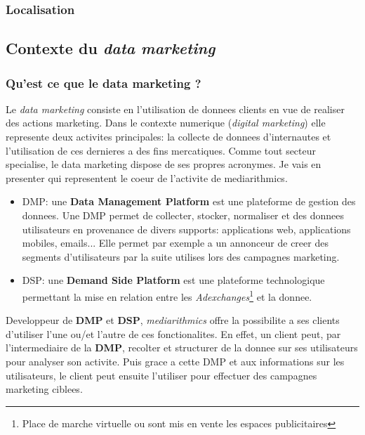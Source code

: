         \subsubsection{Localisation}
    \subsection{Contexte du \emph{data marketing}}
        \subsubsection{Qu'est ce que le data marketing ?}
        Le \emph{data marketing} consiste en l'utilisation de donnees clients en vue de realiser des actions marketing. 
        Dans le contexte numerique (\emph{digital marketing}) elle represente deux activites principales: la collecte de
        donnees d'internautes et l'utilisation de ces dernieres a des fins mercatiques. Comme tout secteur specialise, 
        le data marketing dispose de ses propres acronymes. Je vais en presenter qui representent le coeur de l'activite
        de mediarithmics.
        \begin{itemize}
            \item DMP: une \textbf{Data Management Platform} est une plateforme de gestion des donnees. Une DMP permet
            de collecter, stocker, normaliser et des donnees utilisateurs en provenance de divers supports: applications
            web, applications mobiles, emails... Elle permet par exemple a un annonceur de creer des segments 
            d'utilisateurs par la suite utilises lors des campagnes marketing.
            \item DSP: une \textbf{Demand Side Platform} est une plateforme technologique permettant la mise en relation
            entre les \emph{Adexchanges}\footnote{Place de marche virtuelle ou sont mis en vente les espaces publicitaires} et la donnee.
        \end{itemize}
        Developpeur de \textbf{DMP} et \textbf{DSP}, \emph{mediarithmics} offre la possibilite a ses clients d'utiliser 
        l'une ou/et l'autre de ces fonctionalites. En effet, un client peut, par l'intermediaire de la 
        \textbf{DMP}, recolter et structurer de la donnee sur ses utilisateurs pour analyser son activite. 
        Puis grace a cette DMP et aux informations sur les utilisateurs, le client peut ensuite l'utiliser pour 
        effectuer des campagnes marketing ciblees.